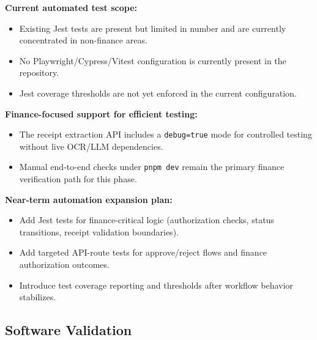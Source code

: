 \documentclass[12pt, titlepage]{article}
\begin{document}
\noindent\textbf{Current automated test scope:}
\begin{itemize}
  \item Existing Jest tests are present but limited in number and are currently concentrated in non-finance areas.
  \item No Playwright/Cypress/Vitest configuration is currently present in the repository.
  \item Jest coverage thresholds are not yet enforced in the current configuration.
\end{itemize}

\noindent\textbf{Finance-focused support for efficient testing:}
\begin{itemize}
  \item The receipt extraction API includes a \texttt{debug=true} mode for controlled testing without live OCR/LLM dependencies.
  \item Manual end-to-end checks under \texttt{pnpm dev} remain the primary finance verification path for this phase.
\end{itemize}

\noindent\textbf{Near-term automation expansion plan:}
\begin{itemize}
  \item Add Jest tests for finance-critical logic (authorization checks, status transitions, receipt validation boundaries).
  \item Add targeted API-route tests for approve/reject flows and finance authorization outcomes.
  \item Introduce test coverage reporting and thresholds after workflow behavior stabilizes.
\end{itemize}

\subsection{Software Validation}



\end{document}
